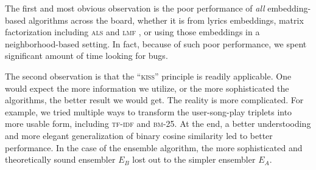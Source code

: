 \documentclass[conference]{IEEEtran}
\begin{document}
The first and most obvious observation is the
poor performance of {\em all} embedding-based algorithms across
the board, whether it is from lyrics embeddings, matrix factorization
including \textsc{als} \cite{hu2008collaborative} and
\textsc{lmf} \cite{johnson2014logistic}, or using those embeddings in a
neighborhood-based setting. In fact, because of such poor performance, we
spent significant amount of time looking for bugs.

The second observation is that the ``\textsc{kiss}'' principle is readily
applicable. One would expect the more information we utilize, or the
more sophisticated the algorithms, the better result we would get. The
reality is more complicated. For example, we tried multiple ways to transform
the user-song-play triplets into more usable form, including
\textsc{tf-idf} and \textsc{bm-25}. At the end, a better understooding and
more elegant generalization of binary cosine similarity led to better
performance. In the case of the ensemble algorithm,
the more sophisticated and
theoretically sound ensembler $E_B$ lost out to the simpler ensembler $E_A$.
\end{document}
